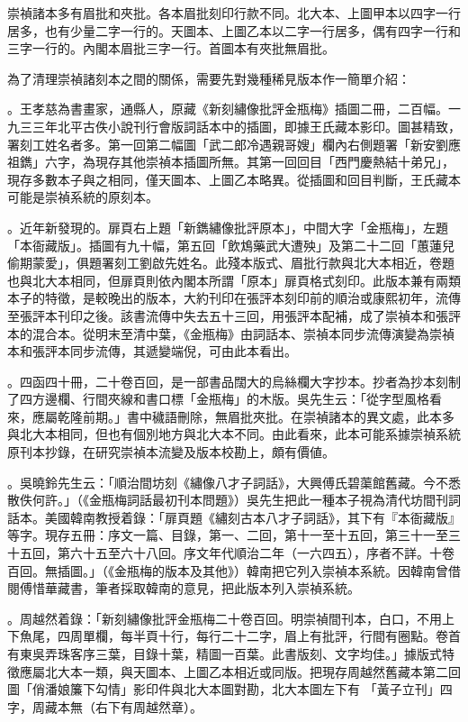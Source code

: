 崇禎諸本多有眉批和夾批。各本眉批刻印行款不同。北大本、上圖甲本以四字一行居多，也有少量二字一行的。天圖本、上圖乙本以二字一行居多，偶有四字一行和三字一行的。內閣本眉批三字一行。首圖本有夾批無眉批。

為了清理崇禎諸刻本之間的關係，需要先對幾種稀見版本作一簡單介紹：

{\large{}}。王孝慈為書畫家，通縣人，原藏《新刻繡像批評金瓶梅》插圖二冊，二百幅。一九三三年北平古佚小說刊行會版詞話本中的插圖，即據王氏藏本影印。圖甚精致，署刻工姓名者多。第一回第二幅圖「武二郎冷遇親哥嫂」欄內右側題署「新安劉應祖鐫」六字，為現存其他崇禎本插圖所無。其第一回回目「西門慶熱結十弟兄」，現存多數本子與之相同，僅天圖本、上圖乙本略異。從插圖和回目判斷，王氏藏本可能是崇禎系統的原刻本。

{\large{}}。近年新發現的。扉頁右上題「新鐫繡像批評原本」，中間大字「金瓶梅」，左題「本衙藏版」。插圖有九十幅，第五回「飲鴆藥武大遭殃」及第二十二回「蕙蓮兒偷期蒙愛」，俱題署刻工劉啟先姓名。此殘本版式、眉批行款與北大本相近，卷題也與北大本相同，但扉頁則依內閣本所謂「原本」扉頁格式刻印。此版本兼有兩類本子的特徵，是較晚出的版本，大約刊印在張評本刻印前的順治或康熙初年，流傳至張評本刊印之後。該書流傳中失去五十三回，用張評本配補，成了崇禎本和張評本的混合本。從明末至清中葉，《金瓶梅》由詞話本、崇禎本同步流傳演變為崇禎本和張評本同步流傳，其遞變端倪，可由此本看出。

{\large{}}。四函四十冊，二十卷百回，是一部書品闊大的烏絲欄大字抄本。抄者為抄本刻制了四方邊欄、行間夾線和書口標「金瓶梅」的木版。吳先生云：「從字型風格看來，應屬乾隆前期。」書中穢語刪除，無眉批夾批。在崇禎諸本的異文處，此本多與北大本相同，但也有個別地方與北大本不同。由此看來，此本可能系據崇禎系統原刊本抄錄，在研究崇禎本流變及版本校勘上，頗有價値。

{\large{}}。吳曉鈴先生云：「順治間坊刻《繡像八才子詞話》，大興傅氏碧蕖館舊藏。今不悉散佚何許。」（《金瓶梅詞話最初刊本問題》）吳先生把此一種本子視為清代坊間刊詞話本。美國韓南教授着錄：「扉頁題《繡刻古本八才子詞話》，其下有『本衙藏版』等字。現存五冊：序文一篇、目錄，第一、二回，第十一至十五回，第三十一至三十五回，第六十五至六十八回。序文年代順治二年（一六四五），序者不詳。十卷百回。無插圖。」（《金瓶梅的版本及其他》）韓南把它列入崇禎本系統。因韓南曾借閱傅惜華藏書，筆者採取韓南的意見，把此版本列入崇禎系統。

{\large{}}。周越然着錄：「新刻繡像批評金瓶梅二十卷百回。明崇禎間刊本，白口，不用上下魚尾，四周單欄，每半頁十行，每行二十二字，眉上有批評，行間有圈點。卷首有東吳弄珠客序三葉，目錄十葉，精圖一百葉。此書版刻、文字均佳。」據版式特徵應屬北大本一類，與天圖本、上圖乙本相近或同版。把現存周越然舊藏本第二回圖「俏潘娘簾下勾情」影印件與北大本圖對勘，北大本圖左下有 「黃子立刊」四字，周藏本無（右下有周越然章）。

